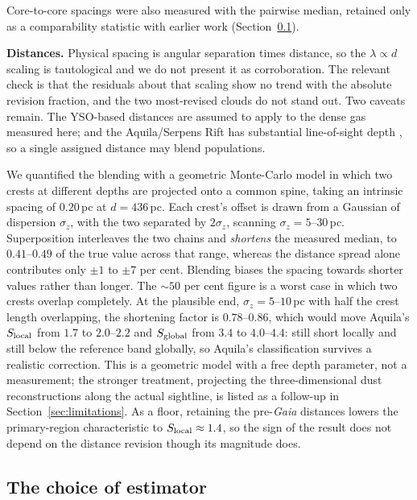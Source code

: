 \documentclass[usenatbib,twoside,twocolumn]{mnras}
\begin{document}
Core-to-core spacings were also measured with the pairwise median, retained only as a comparability statistic with earlier work (Section~\ref{sec:statistics}).

\smallskip\noindent\textbf{Distances.} Physical spacing is angular separation times distance, so the $\lambda\propto d$ scaling is tautological and we do not present it as corroboration. The relevant check is that the residuals about that scaling show no trend with the absolute revision fraction, and the two most-revised clouds do not stand out. Two caveats remain. The YSO-based distances \citep{Zhang2023} are assumed to apply to the dense gas measured here; and the Aquila/Serpens Rift has substantial line-of-sight depth \citep{Zucker2020,Green2024}, so a single assigned distance may blend populations.

We quantified the blending with a geometric Monte-Carlo model in which two crests at different depths are projected onto a common spine, taking an intrinsic spacing of $0.20$\,pc at $d=436$\,pc. Each crest's offset is drawn from a Gaussian of dispersion $\sigma_z$, with the two separated by $2\sigma_z$, scanning $\sigma_z=5$--$30$\,pc. Superposition interleaves the two chains and \emph{shortens} the measured median, to $0.41$--$0.49$ of the true value across that range, whereas the distance spread alone contributes only $\pm1$ to $\pm7$ per cent. Blending biases the spacing towards shorter values rather than longer. The $\sim50$ per cent figure is a worst case in which two crests overlap completely. At the plausible end, $\sigma_z=5$--$10$\,pc with half the crest length overlapping, the shortening factor is $0.78$--$0.86$, which would move Aquila's $S_{\rm local}$ from $1.7$ to $2.0$--$2.2$ and $S_{\rm global}$ from $3.4$ to $4.0$--$4.4$: still short locally and still below the reference band globally, so Aquila's classification survives a realistic correction. This is a geometric model with a free depth parameter, not a measurement; the stronger treatment, projecting the three-dimensional dust reconstructions along the actual sightline, is listed as a follow-up in Section~\ref{sec:limitations}. As a floor, retaining the pre-\textit{Gaia} distances lowers the primary-region characteristic to $S_{\rm local}\approx1.4$, so the sign of the result does not depend on the distance revision though its magnitude does.




\subsection{The choice of estimator}
\label{sec:statistics}
\end{document}
